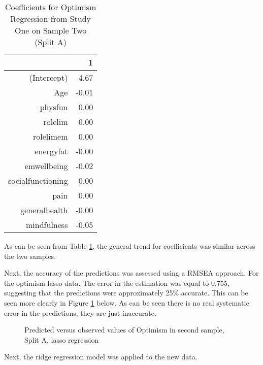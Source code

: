 \documentclass{article}
\begin{document}
\begin{table}[ht]
\centering
\begin{tabular}{rr}
  \hline
 & 1 \\ 
  \hline
(Intercept) & 4.67 \\ 
  Age & -0.01 \\ 
  physfun & 0.00 \\ 
  rolelim & 0.00 \\ 
  rolelimem & 0.00 \\ 
  energyfat & -0.00 \\ 
  emwellbeing & -0.02 \\ 
  socialfunctioning & 0.00 \\ 
  pain & 0.00 \\ 
  generalhealth & -0.00 \\ 
  mindfulness & -0.05 \\ 
   \hline
\end{tabular}
\caption{Coefficients for Optimism Regression from Study One on Sample Two (Split A)} 
\label{tab:homoptlasso2a}
\end{table}
As can be seen from Table \ref{tab:homoptlasso2a}, the general trend for coefficients was similar across the two samples. 

Next, the accuracy of the predictions was assessed using a RMSEA approach. For the optimism lasso data. The error in the estimation was equal to 0.755, suggesting that the predictions were approximately 25\% accurate. This can be seen more clearly in Figure \ref{fig:plotoptlassopred} below. As can be seen there is no real systematic error in the predictions, they are just inaccurate.


\begin{figure}
  \caption{Predicted versus observed values of Optimism in second sample, Split A, lasso regression}
  \label{fig:plotoptlassopred}
\end{figure}


Next, the ridge regression model was applied to the new data. 
\end{document}
